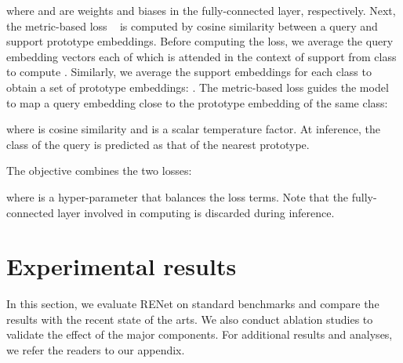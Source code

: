 \documentclass[10pt,twocolumn,letterpaper]{article}
\newcommand{\ours}{RENet\xspace}
\begin{document}
where  and  are weights and biases in the fully-connected layer, respectively.
Next, the metric-based loss ~\cite{matchingnet, protonet} is computed by cosine similarity between a query and support prototype embeddings.
Before computing the loss, we average the  query embedding vectors each of which is attended in the context of  support from  class to compute .
Similarly, we average the  support embeddings for each class to obtain a set of prototype embeddings: .
The metric-based loss guides the model to map a query embedding close to the prototype embedding of the same class:

where  is cosine similarity and  is a scalar temperature factor.
At inference, the class of the query is predicted as that of the nearest prototype.

The objective combines the two losses: 

where  is a hyper-parameter that balances the loss terms.
Note that the fully-connected layer involved in computing  is discarded during inference. \section{Experimental results}
In this section, we evaluate \ours on standard benchmarks and compare the results with the recent state of the arts.
We also conduct ablation studies to validate the effect of the major components.
For additional results and analyses, we refer the readers to our appendix.
\end{document}
